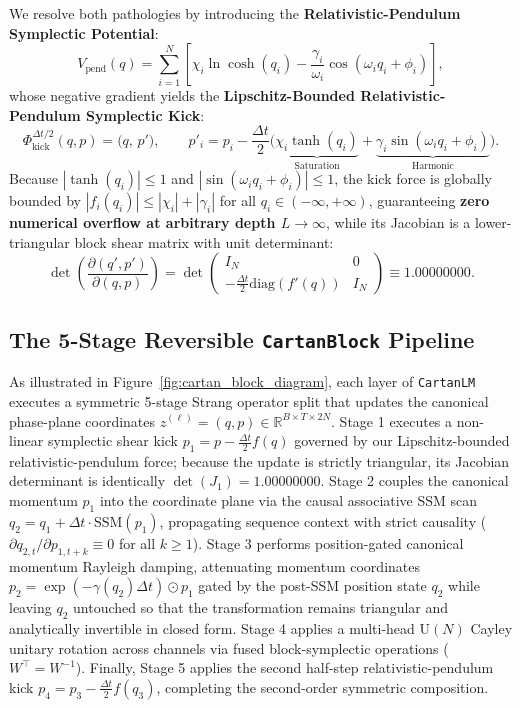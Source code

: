 \documentclass[11pt,a4paper]{article}
\begin{document}
We resolve both pathologies by introducing the \textbf{Relativistic-Pendulum Symplectic Potential}:
\begin{equation}
    V_{\text{pend}}(q) = \sum_{i=1}^N \left[ \chi_i \ln\cosh(q_i) - \frac{\gamma_i}{\omega_i} \cos(\omega_i q_i + \phi_i) \right],
    \label{eq:relativistic_pendulum_potential}
\end{equation}
whose negative gradient yields the \textbf{Lipschitz-Bounded Relativistic-Pendulum Symplectic Kick}:
\begin{equation}
    \Phi_{\text{kick}}^{\Delta t / 2}(q, p) = \big(q,\, p'\big), \qquad p'_i = p_i - \frac{\Delta t}{2}\Big(\underbrace{\chi_i \tanh(q_i)}_{\text{Saturation}} + \underbrace{\gamma_i \sin(\omega_i q_i + \phi_i)}_{\text{Harmonic}}\Big).
    \label{eq:pendulum_kick}
\end{equation}
Because $|\tanh(q_i)| \le 1$ and $|\sin(\omega_i q_i + \phi_i)| \le 1$, the kick force is globally bounded by $|f_i(q_i)| \le |\chi_i| + |\gamma_i|$ for all $q_i \in (-\infty, +\infty)$, guaranteeing \textbf{zero numerical overflow at arbitrary depth $L \to \infty$}, while its Jacobian is a lower-triangular block shear matrix with unit determinant:
\begin{equation}
    \det\left(\frac{\partial(q',p')}{\partial(q,p)}\right) = \det\begin{pmatrix} I_N & 0 \\ -\frac{\Delta t}{2}\mathrm{diag}(f'(q)) & I_N \end{pmatrix} \equiv 1.00000000.
\end{equation}

\subsection{The 5-Stage Reversible \texttt{CartanBlock} Pipeline}
As illustrated in Figure~\ref{fig:cartan_block_diagram}, each layer of \texttt{CartanLM} executes a symmetric 5-stage Strang operator split that updates the canonical phase-plane coordinates $z^{(\ell)} = (q, p) \in \mathbb{R}^{B \times T \times 2N}$. Stage 1 executes a non-linear symplectic shear kick $p_1 = p - \frac{\Delta t}{2} f(q)$ governed by our Lipschitz-bounded relativistic-pendulum force; because the update is strictly triangular, its Jacobian determinant is identically $\det(J_1) = 1.00000000$. Stage 2 couples the canonical momentum $p_1$ into the coordinate plane via the causal associative SSM scan $q_2 = q_1 + \Delta t \cdot \mathrm{SSM}(p_1)$, propagating sequence context with strict causality ($\partial q_{2,t}/\partial p_{1,t+k} \equiv 0$ for all $k \ge 1$). Stage 3 performs position-gated canonical momentum Rayleigh damping, attenuating momentum coordinates $p_2 = \exp(-\gamma(q_2)\Delta t) \odot p_1$ gated by the post-SSM position state $q_2$ while leaving $q_2$ untouched so that the transformation remains triangular and analytically invertible in closed form. Stage 4 applies a multi-head $\mathrm{U}(N)$ Cayley unitary rotation across channels via fused block-symplectic operations ($W^\top = W^{-1}$). Finally, Stage 5 applies the second half-step relativistic-pendulum kick $p_4 = p_3 - \frac{\Delta t}{2} f(q_3)$, completing the second-order symmetric composition.
\end{document}
